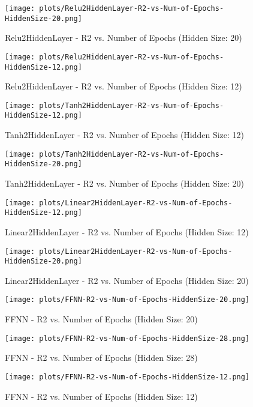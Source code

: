 
\begin{figure}[H]
    \centering
    \texttt{[image: plots/Relu2HiddenLayer-R2-vs-Num-of-Epochs-HiddenSize-20.png]}
    \caption{Relu2HiddenLayer - R2 vs. Number of Epochs (Hidden Size: 20)}
\end{figure}

\begin{figure}[H]
    \centering
    \texttt{[image: plots/Relu2HiddenLayer-R2-vs-Num-of-Epochs-HiddenSize-12.png]}
    \caption{Relu2HiddenLayer - R2 vs. Number of Epochs (Hidden Size: 12)}
\end{figure}

\begin{figure}[H]
    \centering
    \texttt{[image: plots/Tanh2HiddenLayer-R2-vs-Num-of-Epochs-HiddenSize-12.png]}
    \caption{Tanh2HiddenLayer - R2 vs. Number of Epochs (Hidden Size: 12)}
\end{figure}

\begin{figure}[H]
    \centering
    \texttt{[image: plots/Tanh2HiddenLayer-R2-vs-Num-of-Epochs-HiddenSize-20.png]}
    \caption{Tanh2HiddenLayer - R2 vs. Number of Epochs (Hidden Size: 20)}
\end{figure}

\begin{figure}[H]
    \centering
    \texttt{[image: plots/Linear2HiddenLayer-R2-vs-Num-of-Epochs-HiddenSize-12.png]}
    \caption{Linear2HiddenLayer - R2 vs. Number of Epochs (Hidden Size: 12)}
\end{figure}

\begin{figure}[H]
    \centering
    \texttt{[image: plots/Linear2HiddenLayer-R2-vs-Num-of-Epochs-HiddenSize-20.png]}
    \caption{Linear2HiddenLayer - R2 vs. Number of Epochs (Hidden Size: 20)}
\end{figure}

\begin{figure}[H]
    \centering
    \texttt{[image: plots/FFNN-R2-vs-Num-of-Epochs-HiddenSize-20.png]}
    \caption{FFNN - R2 vs. Number of Epochs (Hidden Size: 20)}
\end{figure}

\begin{figure}[H]
    \centering
    \texttt{[image: plots/FFNN-R2-vs-Num-of-Epochs-HiddenSize-28.png]}
    \caption{FFNN - R2 vs. Number of Epochs (Hidden Size: 28)}
\end{figure}

\begin{figure}[H]
    \centering
    \texttt{[image: plots/FFNN-R2-vs-Num-of-Epochs-HiddenSize-12.png]}
    \caption{FFNN - R2 vs. Number of Epochs (Hidden Size: 12)}
\end{figure}
